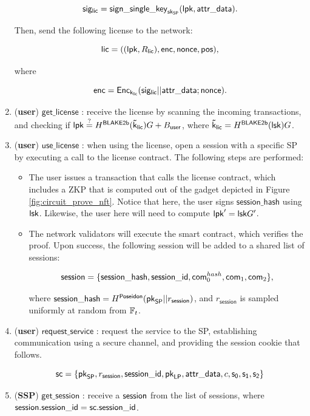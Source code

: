 \begin{enumerate}
		$$\mathsf{sig_{lic}} = \mathsf{sign\_single\_key}_{\mathsf{sk}_{\mathsf{SP}}}(\mathsf{lpk}, \mathsf{attr\_data}).$$

	Then, send the following license to the network:

		$$\mathsf{lic} = ((\mathsf{lpk}, R_{\mathsf{lic}}), \mathsf{enc}, \mathsf{nonce}, \mathsf{pos}),$$

	where 

		$$\mathsf{enc} = \mathsf{Enc}_{\mathsf{k_{lic}}} (\mathsf{sig_{lic}} || \mathsf{attr\_data}; \mathsf{nonce}).$$

	\item (\textbf{user}) $\mathsf{get\_license}$ : receive the license by scanning the incoming transactions, and checking if $\mathsf{lpk} \stackrel{?}{=} H^\mathsf{BLAKE2b}(\mathsf{\tilde{k}_{lic}}) G + B_{\mathsf{user}}$, where $\mathsf{\tilde{k}_{lic}} = H^\mathsf{BLAKE2b}(\mathsf{lsk})G$.

	\item (\textbf{user}) $\mathsf{use\_license}$ : when using the license, open a session with a specific SP by executing a call to the license contract. The following steps are performed:

	\begin{itemize}
		\item The user issues a transaction that calls the license contract, which includes a ZKP that is computed out of the gadget depicted in Figure \ref{fig:circuit_prove_nft}. Notice that here, the user signs $\mathsf{session\_hash}$ using $\mathsf{lsk}$. Likewise, the user here will need to compute $\mathsf{lpk}' = \mathsf{lsk} G'$.
		\item The network validators will execute the smart contract, which verifies the proof. Upon success, the following session will be added to a shared list of sessions:

			$$\mathsf{session} = \{\mathsf{session\_hash}, \mathsf{session\_id}, \mathsf{com}_0^{hash}, \mathsf{com}_1, \mathsf{com}_2\},$$

		where $\mathsf{session\_hash} = H^\mathsf{Poseidon}(\mathsf{pk}_{\mathsf{SP}} || r_\mathsf{session})$, and $r_\mathsf{session}$ is sampled uniformly at random from $\mathbb{F}_t$.


	\end{itemize}

	\item (\textbf{user}) $\mathsf{request\_service}$ : request the service to the SP, establishing communication using a secure channel, and providing the session cookie that follows.

		$$\mathsf{sc} = \{\mathsf{pk}_{\mathsf{SP}}, r_\mathsf{session}, \mathsf{session\_id}, \mathsf{pk}_{\mathsf{LP}}, \mathsf{attr\_data}, c, \mathsf{s_0}, \mathsf{s_1}, \mathsf{s_2}\}$$

	\item (\textbf{SSP}) $\mathsf{get\_session}$ : receive a $\mathsf{session}$ from the list of sessions, where $\mathsf{session}.\mathsf{session\_id} = \mathsf{sc}.\mathsf{session\_id}$.


\end{enumerate}
